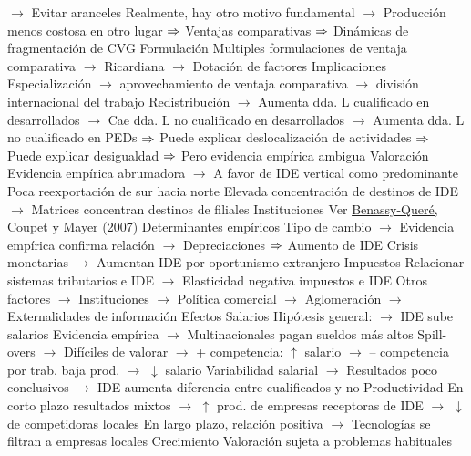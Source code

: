 \documentclass{nuevotema}
\begin{document}
\begin{esquemal}
				\4[] $\to$ Evitar aranceles
				\4[] Realmente, hay otro motivo fundamental
				\4[] $\to$ Producción menos costosa en otro lugar
				\4[] $\Rightarrow$ Ventajas comparativas
				\4[] $\Rightarrow$ Dinámicas de fragmentación de CVG
				\4 Formulación
				\4[] Multiples formulaciones de ventaja comparativa
				\4[] $\to$ Ricardiana
				\4[] $\to$ Dotación de factores
				\4 Implicaciones
				\4[] Especialización
				\4[] $\to$ aprovechamiento de ventaja comparativa
				\4[] $\to$ división internacional del trabajo
				\4[] Redistribución
				\4[] $\to$ Aumenta dda. L cualificado en desarrollados
				\4[] $\to$ Cae dda. L no cualificado en desarrollados
				\4[] $\to$ Aumenta dda. L no cualificado en PEDs
				\4[] $\Rightarrow$ Puede explicar deslocalización de actividades
				\4[] $\Rightarrow$ Puede explicar desigualdad
				\4[] $\Rightarrow$ Pero evidencia empírica ambigua
				\4 Valoración
				\4[] Evidencia empírica abrumadora
				\4[] $\to$ A favor de IDE vertical como predominante
				\4[] Poca reexportación de sur hacia norte
				\4[] Elevada concentración de destinos de IDE
				\4[] $\to$ Matrices concentran destinos de filiales
			\3 Instituciones
				\4 Ver \href{https://core.ac.uk/download/pdf/35310841.pdf}{Benassy-Queré, Coupet y Mayer (2007)}
			\3 Determinantes empíricos
				\4 Tipo de cambio
				\4[] $\to$ Evidencia empírica confirma relación
				\4[] $\to$ Depreciaciones $\Rightarrow$ Aumento de IDE
				\4[] Crisis monetarias
				\4[] $\to$ Aumentan IDE por oportunismo extranjero
				\4 Impuestos
				\4[] Relacionar sistemas tributarios e IDE
				\4[] $\to$ Elasticidad negativa impuestos e IDE
				\4 Otros factores
				\4[] $\to$ Instituciones
				\4[] $\to$ Política comercial
				\4[] $\to$ Aglomeración
				\4[] $\to$ Externalidades de información
			\3 Efectos
				\4 Salarios
				\4[] Hipótesis general:
				\4[] $\to$ IDE sube salarios
				\4[] Evidencia empírica
				\4[] $\to$ Multinacionales pagan sueldos más altos
				\4[] Spill-overs
				\4[] $\to$ Difíciles de valorar
				\4[] $\to$ + competencia: $\uparrow$ salario
				\4[] $\to$ -- competencia por trab. baja prod. $\to$ $\downarrow$ salario
				\4[] Variabilidad salarial
				\4[] $\to$ Resultados poco conclusivos
				\4[] $\to$ IDE aumenta diferencia entre cualificados y no
				\4 Productividad
				\4[] En corto plazo resultados mixtos
				\4[] $\to$ $\uparrow$ prod. de empresas receptoras de IDE
				\4[] $\to$ $\downarrow$ de competidoras locales
				\4[] En largo plazo, relación positiva
				\4[] $\to$ Tecnologías se filtran a empresas locales
				\4 Crecimiento
				\4[] Valoración sujeta a problemas habituales

\end{esquemal}
\end{document}
